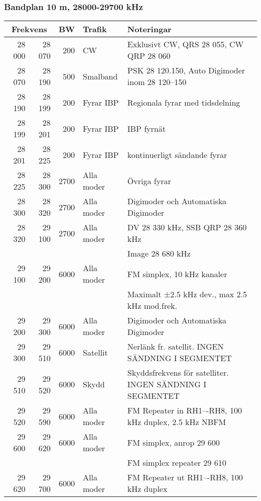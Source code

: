 \begin{landscape}
\subsubsection{Bandplan 10 m, 28000-29700 kHz}
\begin{tabular}{rrrll}
\multicolumn{2}{c}{\textbf{Frekvens}} & \textbf{BW} & \textbf{Trafik} & \textbf{Noteringar} \\ \hline

28 000 & 28 070 & 200  & CW         & Exklusivt CW, QRS 28 055, CW QRP 28 060                   \\ \hline
28 070 & 28 190 & 500  & Smalband   & PSK 28 120.150, Auto Digimoder inom 28 120--150           \\ \hline
28 190 & 28 199 & 200  & Fyrar IBP  & Regionala fyrar med tidsdelning                           \\ \hline
28 199 & 28 201 & 200  & Fyrar IBP  & IBP fyrnät                                                \\ \hline
28 201 & 28 225 & 200  & Fyrar IBP  & kontinuerligt sändande fyrar                              \\ \hline
28 225 & 28 300 & 2700 & Alla moder & Övriga fyrar                                              \\ \hline
28 300 & 28 320 & 2700 & Alla moder & Digimoder och Automatiska Digimoder                       \\ \hline
28 320 & 29 100 & 2700 & Alla moder & DV 28 330 kHz, SSB QRP 28 360 kHz                         \\
       &        &      &            & Image 28 680 kHz                                          \\ \hline
29 100 & 29 200 & 6000 & Alla moder & FM simplex, 10 kHz kanaler                                \\
       &        &      &            & Maximalt ±2.5 kHz dev., max 2.5 kHz mod.frek.             \\ \hline
29 200 & 29 300 & 6000 & Alla moder & Digimoder och Automatiska Digimoder                       \\ \hline
29 300 & 29 510 & 6000 & Satellit   & Nerlänk fr. satellit. INGEN SÄNDNING I SEGMENTET          \\ \hline
29 510 & 29 520 & 6000 & Skydd      & Skyddsfrekvens för satelliter. INGEN SÄNDNING I SEGMENTET \\ \hline
29 520 & 29 590 & 6000 & Alla moder & FM Repeater in RH1–-RH8, 100 kHz duplex, 2.5 kHz NBFM     \\ \hline
29 600 & 29 620 & 6000 & Alla moder & FM simplex, anrop 29 600                                  \\
       &        &      &            & FM simplex repeater 29 610                                \\ \hline
29 620 & 29 700 & 6000 & Alla moder & FM Repeater ut RH1–-RH8, 100 kHz duplex                   \\ \hline
\end{tabular}


\end{landscape}
